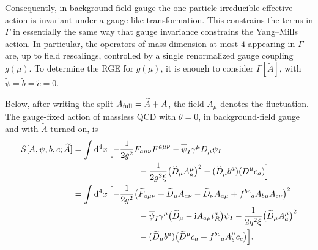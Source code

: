 Consequently, in background-field gauge the one-particle-irreducible
effective action is invariant under a gauge-like transformation.  This
constrains the terms in \(\Gamma\) in essentially the same way that gauge
invariance constrains the Yang--Mills action.  In particular, the
operators of mass dimension at most \(4\) appearing in \(\Gamma\) are,
up to field rescalings, controlled by a single renormalized gauge coupling
\(g(\mu)\).  To determine the RGE for \(g(\mu)\), it is enough to consider
\(\Gamma[\widetilde A]\), with
\(\widetilde\psi=\widetilde b=\widetilde c=0\).

Below, after writing the split \(A_{\rm full}=\widetilde A+A\), the field
\(A_\mu\) denotes the fluctuation.  The gauge-fixed action of massless QCD
with \(\theta=0\), in background-field gauge and with
\(\widetilde A\) turned on, is
\[
\begin{aligned}
  S[A,\psi,b,c;\widetilde A]
  &=
  \int\mathrm{d}^4x\,
  \Bigl[
    -\frac{1}{2g^2}F_{a\mu\nu}F^{a\mu\nu}
    -\overline\psi_I\gamma^\mu D_\mu\psi_I
\\
  &\hspace{2.7cm}
    -\frac{1}{2g^2\xi}
      \bigl(\widetilde D_\mu A_a^\mu\bigr)^2
    -(\widetilde D_\mu b^a)(D^\mu c_a)
  \Bigr]
\\
  &=
  \int\mathrm{d}^4x\,
  \Bigl[
    -\frac{1}{2g^2}
    \bigl(
      \widetilde F_{a\mu\nu}
      +\widetilde D_\mu A_{a\nu}
      -\widetilde D_\nu A_{a\mu}
      +f^{bc}{}_{a}A_{b\mu}A_{c\nu}
    \bigr)^2
\\
  &\hspace{2.7cm}
    -\overline\psi_I\gamma^\mu
      \bigl(\widetilde D_\mu-\mathrm{i} A_{a\mu}t_R^a\bigr)\psi_I
    -\frac{1}{2g^2\xi}
      \bigl(\widetilde D_\mu A_a^\mu\bigr)^2
\\
  &\hspace{2.7cm}
    -(\widetilde D_\mu b^a)
      \bigl(\widetilde D^\mu c_a+f^{bc}{}_{a}A_b^\mu c_c\bigr)
  \Bigr].
\end{aligned}
\]


